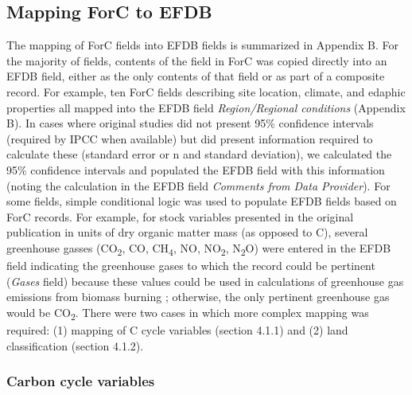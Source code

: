 \documentclass[, manuscript]{copernicus}
\begin{document}
\subsection{Mapping ForC to EFDB}

The mapping of ForC fields into EFDB fields is summarized in Appendix B.
For the majority of fields, contents of the field in ForC was copied
directly into an EFDB field, either as the only contents of that field
or as part of a composite record. For example, ten ForC fields
describing site location, climate, and edaphic properties all mapped
into the EFDB field \emph{Region/Regional conditions} (Appendix B). In
cases where original studies did not present 95\% confidence intervals
(required by IPCC when available) but did present information required
to calculate these (standard error or n and standard deviation), we
calculated the 95\% confidence intervals and populated the EFDB field
with this information (noting the calculation in the EFDB field
\emph{Comments from Data Provider}). For some fields, simple conditional
logic was used to populate EFDB fields based on ForC records. For
example, for stock variables presented in the original publication in
units of dry organic matter mass (as opposed to C), several greenhouse
gasses (CO\textsubscript{2}, CO, CH\textsubscript{4}, NO,
NO\textsubscript{2}, N\textsubscript{2}O) were entered in the EFDB field
indicating the greenhouse gases to which the record could be pertinent
(\emph{Gases} field) because these values could be used in calculations
of greenhouse gas emissions from biomass burning \citep{ipcc_2006_2006};
otherwise, the only pertinent greenhouse gas would be
CO\textsubscript{2}. There were two cases in which more complex mapping
was required: (1) mapping of C cycle variables (section 4.1.1) and (2)
land classification (section 4.1.2).

\subsubsection{Carbon cycle variables}
\end{document}
